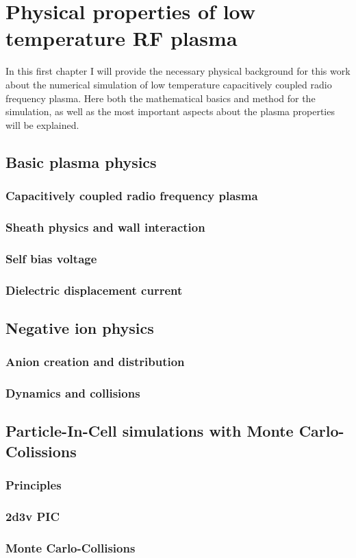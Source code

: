 \chapter{Physical properties of low temperature RF plasma}

  In this first chapter I will provide the necessary physical background 
  for this work about the numerical simulation of low temperature 
  capacitively coupled radio frequency plasma. Here both the mathematical 
  basics and method for the simulation, as well as the most important aspects
  about the plasma properties will be explained.

  \section{Basic plasma physics}

    \subsection{Capacitively coupled radio frequency plasma}

    \subsection{Sheath physics and wall interaction}

    \subsection{Self bias voltage}

    \subsection{Dielectric displacement current}

  \section{Negative ion physics}

    \subsection{Anion creation and distribution}

    \subsection{Dynamics and collisions}

  \section{Particle-In-Cell simulations with Monte Carlo-Colissions}

    \subsection{Principles}

    \subsection{2d3v PIC}

    \subsection{Monte Carlo-Collisions}
